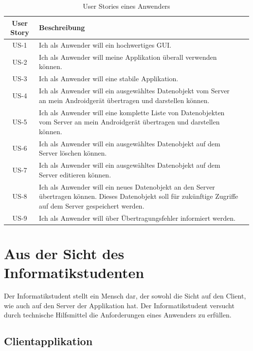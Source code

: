 \documentclass[abstracton, listof=totocnumbered,
bibliography=totocnumbered]{scrreprt}
\begin{document}
  \begin{table}[h]
    \begin{center}
      \begin{tabular}{cp{13cm}l}
        \toprule
        User Story & Beschreibung \\
        \midrule
        US-1 & Ich als Anwender will ein hochwertiges \ac{GUI}. \\
        US-2 & Ich als Anwender will meine Applikation überall verwenden können. \\
        US-3 & Ich als Anwender will eine stabile Applikation. \\
        US-4 & Ich als Anwender will ein ausgewähltes Datenobjekt vom Server an mein
        Androidgerät übertragen und darstellen können. \\
        US-5 & Ich als Anwender will eine komplette Liste von Datenobjekten vom
        Server an mein Androidgerät übertragen und darstellen können. \\
        US-6 & Ich als Anwender will ein ausgewähltes Datenobjekt auf dem Server
        löschen können. \\
        US-7 & Ich als Anwender will ein ausgewähltes Datenobjekt auf dem Server
        editieren können. \\
        US-8 & Ich als Anwender will ein neues Datenobjekt an den Server übertragen
        können. Dieses Datenobjekt soll für zukünftige Zugriffe auf dem Server
        gespeichert werden. \\
        US-9 & Ich als Anwender will über Übertragungsfehler informiert werden. \\
        \bottomrule
      \end{tabular}
      \caption{User Stories eines Anwenders}
      \label{tab:anwenderUserStories}
    \end{center}
  \end{table}
  
  \newpage
  
  \section{Aus der Sicht des Informatikstudenten}
  
  Der Informatikstudent stellt ein Mensch dar, der sowohl die Sicht auf den
  Client, wie auch auf den Server der Applikation hat. Der Informatikstudent
  versucht durch technische Hilfsmittel die Anforderungen eines Anwenders zu
  erfüllen.
  
  \subsection{Clientapplikation}
  
\end{document}
